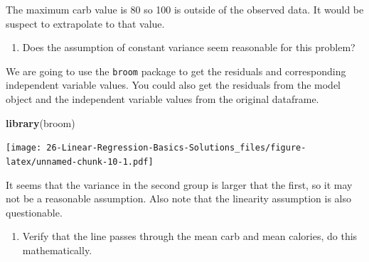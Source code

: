 \documentclass[
]{book}
\newenvironment{Shaded}{\begin{snugshade}}{\end{snugshade}}
\newcommand{\DataTypeTok}[1]{\textcolor[rgb]{0.13,0.29,0.53}{#1}}
\newcommand{\DecValTok}[1]{\textcolor[rgb]{0.00,0.00,0.81}{#1}}
\newcommand{\KeywordTok}[1]{\textcolor[rgb]{0.13,0.29,0.53}{\textbf{#1}}}
\newcommand{\NormalTok}[1]{#1}
\newcommand{\OperatorTok}[1]{\textcolor[rgb]{0.81,0.36,0.00}{\textbf{#1}}}
\newcommand{\StringTok}[1]{\textcolor[rgb]{0.31,0.60,0.02}{#1}}
\providecommand{\tightlist}{%
  \setlength{\itemsep}{0pt}\setlength{\parskip}{0pt}}
\begin{document}
The maximum carb value is 80 so 100 is outside of the observed data. It would be suspect to extrapolate to that value.

\begin{enumerate}
\def\labelenumi{\alph{enumi}.}
\setcounter{enumi}{9}
\tightlist
\item
  Does the assumption of constant variance seem reasonable for this problem?
\end{enumerate}

We are going to use the \texttt{broom} package to get the residuals and corresponding independent variable values. You could also get the residuals from the model object and the independent variable values from the original dataframe.

\begin{Shaded}
\begin{Highlighting}[]
\KeywordTok{library}\NormalTok{(broom)}
\end{Highlighting}
\end{Shaded}

\begin{Shaded}
\end{Shaded}

\texttt{[image: 26-Linear-Regression-Basics-Solutions\_files/figure-latex/unnamed-chunk-10-1.pdf]}

It seems that the variance in the second group is larger that the first, so it may not be a reasonable assumption. Also note that the linearity assumption is also questionable.

\begin{enumerate}
\def\labelenumi{\alph{enumi}.}
\setcounter{enumi}{10}
\tightlist
\item
  Verify that the line passes through the mean carb and mean calories, do this mathematically.
\end{enumerate}
\end{document}
